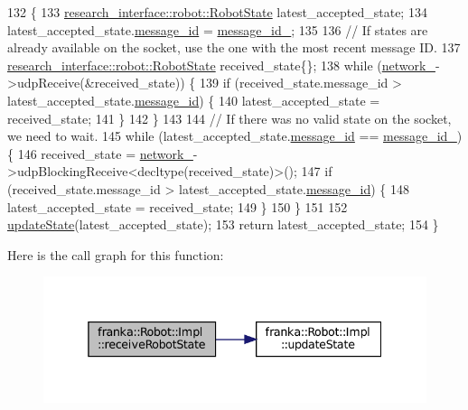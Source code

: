 \begin{DoxyCode}
132                                                                \{
133   \hyperlink{structresearch__interface_1_1robot_1_1RobotState}{research\_interface::robot::RobotState} latest\_accepted\_state;
134   latest\_accepted\_state.\hyperlink{structresearch__interface_1_1robot_1_1RobotState_a803676123685390b8c4d5a3907d16e7c}{message\_id} = \hyperlink{classfranka_1_1Robot_1_1Impl_aed154fce2f3a44a60b7397405974d395}{message\_id\_};
135 
136   \textcolor{comment}{// If states are already available on the socket, use the one with the most recent message ID.}
137   \hyperlink{structresearch__interface_1_1robot_1_1RobotState}{research\_interface::robot::RobotState} received\_state\{\};
138   \textcolor{keywordflow}{while} (\hyperlink{classfranka_1_1Robot_1_1Impl_acecf3b158ccd1c2ed7e76971f1e6a192}{network\_}->udpReceive(&received\_state)) \{
139     \textcolor{keywordflow}{if} (received\_state.message\_id > latest\_accepted\_state.\hyperlink{structresearch__interface_1_1robot_1_1RobotState_a803676123685390b8c4d5a3907d16e7c}{message\_id}) \{
140       latest\_accepted\_state = received\_state;
141     \}
142   \}
143 
144   \textcolor{comment}{// If there was no valid state on the socket, we need to wait.}
145   \textcolor{keywordflow}{while} (latest\_accepted\_state.\hyperlink{structresearch__interface_1_1robot_1_1RobotState_a803676123685390b8c4d5a3907d16e7c}{message\_id} == \hyperlink{classfranka_1_1Robot_1_1Impl_aed154fce2f3a44a60b7397405974d395}{message\_id\_}) \{
146     received\_state = \hyperlink{classfranka_1_1Robot_1_1Impl_acecf3b158ccd1c2ed7e76971f1e6a192}{network\_}->udpBlockingReceive<decltype(received\_state)>();
147     \textcolor{keywordflow}{if} (received\_state.message\_id > latest\_accepted\_state.\hyperlink{structresearch__interface_1_1robot_1_1RobotState_a803676123685390b8c4d5a3907d16e7c}{message\_id}) \{
148       latest\_accepted\_state = received\_state;
149     \}
150   \}
151 
152   \hyperlink{classfranka_1_1Robot_1_1Impl_a79e762e0bc2fe77fdfe7614963883be7}{updateState}(latest\_accepted\_state);
153   \textcolor{keywordflow}{return} latest\_accepted\_state;
154 \}
\end{DoxyCode}
Here is the call graph for this function\+:
\nopagebreak
\begin{figure}[H]
\begin{center}
\leavevmode
\includegraphics[width=338pt]{classfranka_1_1Robot_1_1Impl_a15161988fd2644aa2757e196e4488b38_cgraph}
\end{center}
\end{figure}
